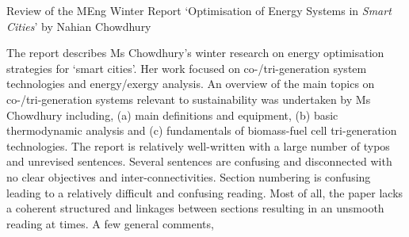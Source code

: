 \documentclass[14pt,twoside]{report}
\begin{document}
\clearpage




\bigskip

\begin{center}
  {\Large Review of the MEng Winter Report `Optimisation of Energy Systems in {\it Smart Cities}' by Nahian Chowdhury}
\end{center}

The report describes Ms Chowdhury's winter research on energy optimisation strategies for `smart cities'. Her work focused on co-/tri-generation system technologies and energy/exergy analysis. An overview of the main topics on co-/tri-generation systems relevant to sustainability was undertaken by Ms Chowdhury including, (a) main definitions and equipment, (b) basic thermodynamic analysis and (c) fundamentals of biomass-fuel cell tri-generation technologies.  The report is relatively well-written with a large number of typos and unrevised sentences. Several sentences are confusing and disconnected with no clear objectives and inter-connectivities. Section numbering is confusing leading to a relatively difficult and confusing reading. Most of all, the paper lacks a coherent structured and linkages between sections resulting in an unsmooth reading at times. A few general comments,
\end{document}

